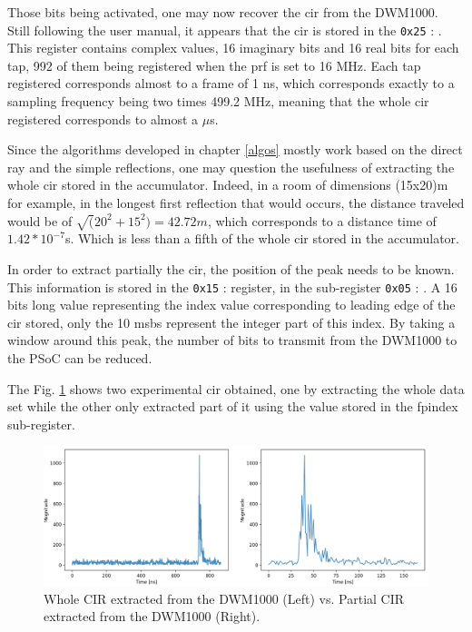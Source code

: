 Those bits being activated, one may now recover the \gls{cir} from the DWM1000. Still following the user manual, it appears that the \gls{cir} is stored in the \texttt{0x25} : . This register contains complex values, 16 imaginary bits and 16 real bits for each tap, 992 of them being registered when the \gls{prf} is set to 16 MHz. Each tap registered corresponds almost to a frame of 1 ns, which corresponds exactly to a sampling frequency  being two times 499.2 MHz, meaning that the whole \gls{cir} registered corresponds to almost a $\mu$s.
\vspace{2mm}

Since the algorithms developed in chapter \ref{algos} mostly work based on the direct ray and the simple reflections, one may question the usefulness of extracting the whole \gls{cir} stored in the accumulator. Indeed, in a room of dimensions (15x20)m for example, in the longest first reflection that would occurs, the distance traveled would be of $\sqrt(20^2 + 15^2) = 42.72m$, which corresponds to a distance time of $1.42*10^{-7}$s. Which is less than a fifth of the whole \gls{cir} stored in the accumulator.
\vspace{2mm}

In order to extract partially the \gls{cir}, the position of the peak needs to be known. This information is stored in the \texttt{0x15} :  register, in the sub-register \texttt{0x05} :  . A 16 bits long value representing the index value corresponding to leading edge of the \gls{cir} stored, only the 10 \glspl{msb} represent the integer part of this index. By taking a window around this peak, the number of bits to transmit from the DWM1000 to the PSoC can be reduced.
\vspace{2mm}

The Fig. \ref{fig:cir_long_short} shows two experimental \gls{cir} obtained, one by extracting the whole data set while the other only extracted part of it using the value stored in the \gls{fpindex} sub-register.

\begin{figure}[H]
\centering
\includegraphics[width=\linewidth]{Images/extracted_cir.png}
\caption{Whole CIR extracted from the DWM1000 (Left) vs. Partial CIR extracted from the DWM1000 (Right). \label{fig:cir_long_short}}
\end{figure}

